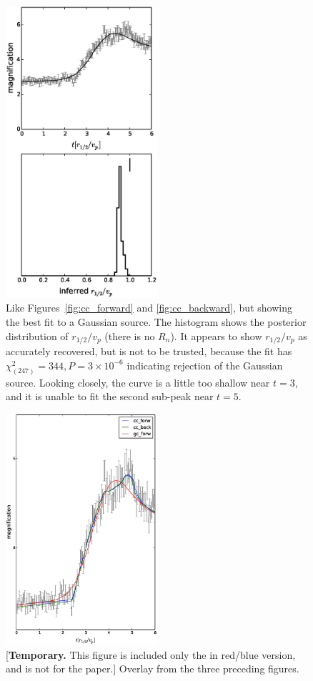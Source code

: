 \documentclass[usenatbib]{mn2e}
\begin{document}
\begin{figure}
\centering
  \includegraphics[width=0.5\textwidth]{figures/gc_forward.eps}
\caption{\label{fig:gc_forward} Like Figures~\ref{fig:cc_forward} and
  \ref{fig:cc_backward}, but showing the best fit to a Gaussian
  source.  The histogram shows the posterior distribution of $r_{1/2}/v_p$
  (there is no $R_n$).  It appears to show $r_{1/2}/v_p$ as accurately
  recovered, but is not to be trusted, because the fit has
  $\chi^2_{(247)}=344, P=3\times10^{-6}$ indicating rejection of the
  Gaussian source.  Looking closely, the curve is a little too shallow
  near $t=3$, and it is unable to fit the second sub-peak near $t=5$.}
\end{figure}

\begin{figure}
\centering
  \includegraphics[width=0.5\textwidth]{compare-mag.eps}
\caption{[{\bf Temporary.} This figure is included only the in
    red/blue version, and is not for the paper.] Overlay from the
  three preceding figures.}
\end{figure}
\end{document}

